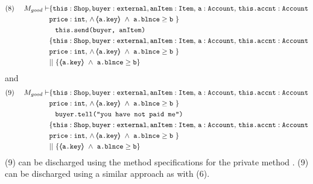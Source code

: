 \begin{proofO}
\small
\begin{align*}
\text{(8)}  \ \ \ \ M_{good} \vdash &  \{  \prg{this}:\prg{Shop}, \prg{buyer} : \prg{external}, \prg{anItem} : \prg{Item},\, \prg{a}:\prg{Account},\, \prg{this.accnt}:\prg{Account}\\
				& \prg{price} : \prg{int},\,
				  \wedge\, 
				  \inside{\prg{a.key}}\ \wedge\ {\prg{a.blnce} \geq \prg{b}}\ \}\\
		  		&\;\;\; \prg{this.send(buyer, anItem)}\ \\  
		  		&  \{  \prg{this}:\prg{Shop}, \prg{buyer} : \prg{external}, \prg{anItem} : \prg{Item},\, \prg{a}:\prg{Account},\, \prg{this.accnt}:\prg{Account}\\
				& \prg{price} : \prg{int},\,
				  \wedge\, 
				  \inside{\prg{a.key}}\ \wedge\ {\prg{a.blnce} \geq \prg{b}}\ \}\\ 
				& || \  \{ \inside{\prg{a.key}}\ \wedge\ {\prg{a.blnce} \geq \prg{b}} \}
\end{align*}
\normalsize
and 
\small
\begin{align*}
\text{(9)}  \ \ \ \ M_{good} \vdash & \{  \prg{this}:\prg{Shop}, \prg{buyer} : \prg{external}, \prg{anItem} : \prg{Item},\, \prg{a}:\prg{Account},\, \prg{this.accnt}:\prg{Account}\\
				& \prg{price} : \prg{int},\,
				  \wedge\, 
				  \inside{\prg{a.key}}\ \wedge\ {\prg{a.blnce} \geq \prg{b}}\ \}\\
		  		&\;\;\; \prg{buyer.tell("you have not paid me")}\ \\  
		  		&  \{  \prg{this}:\prg{Shop}, \prg{buyer} : \prg{external}, \prg{anItem} : \prg{Item},\, \prg{a}:\prg{Account},\, \prg{this.accnt}:\prg{Account}\\
				& \prg{price} : \prg{int},\,
				  \wedge\, 
				  \inside{\prg{a.key}}\ \wedge\ {\prg{a.blnce} \geq \prg{b}}\ \}\\ 
				& || \  \{ \inside{\prg{a.key}}\ \wedge\ {\prg{a.blnce} \geq \prg{b}} \}
\end{align*}
\normalsize
(9) can be discharged using the method specifications for the private method . (9) can be discharged using a similar approach as with (6).


\end{proofO}
